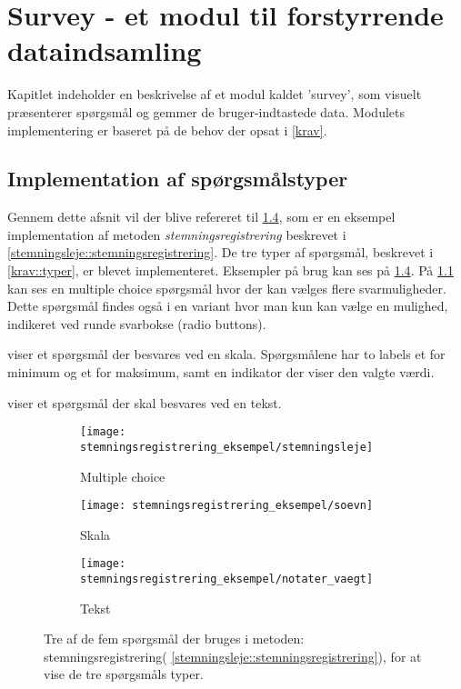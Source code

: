 \chapter{Survey - et modul til forstyrrende dataindsamling}\label{survey}
Kapitlet indeholder en beskrivelse af et modul kaldet 'survey', som visuelt præsenterer spørgsmål og gemmer de bruger-indtastede data.
Modulets implementering er baseret på de behov der opsat i \cref{krav}.

\section{Implementation af spørgsmålstyper}\label{survey:spg}
Gennem dette afsnit vil der blive refereret til \cref{stemreg::spoergsmaal}, som er en eksempel implementation af metoden  \emph{stemningsregistrering} beskrevet i \cref{stemningsleje::stemningsregistrering}.
De tre typer af spørgsmål, beskrevet i \cref{krav::typer}, er blevet implementeret.
Eksempler på brug kan ses på \cref{stemreg::spoergsmaal}.
På \cref{stemreg::stemningsleje} kan ses en multiple choice spørgsmål hvor der kan vælges flere svarmuligheder.
Dette spørgsmål findes også i en variant hvor man kun kan vælge en mulighed, indikeret ved runde svarbokse (radio buttons).

 viser et spørgsmål der besvares ved en skala. 
Spørgsmålene har to labels et for minimum og et for maksimum, samt en indikator der viser den valgte værdi.

 viser et spørgsmål der skal besvares ved en tekst. 


\begin{figure}
	\centering
	\begin{subfigure}[b]{0.45\textwidth}
		\texttt{[image: stemningsregistrering\_eksempel/stemningsleje]}
		\caption{Multiple choice}\label{stemreg::stemningsleje}
	\end{subfigure}
	\hfill
\begin{minipage}[b]{0.45\textwidth}
	\begin{subfigure}[b]{\textwidth}
		\texttt{[image: stemningsregistrering\_eksempel/soevn]}
		\caption{Skala}\label{stemreg::soevn}
	\end{subfigure}
	\newline 
	\begin{subfigure}[b]{\textwidth}
		\texttt{[image: stemningsregistrering\_eksempel/notater\_vaegt]}
		\caption{Tekst}\label{stemreg::notater_vaegt}
	\end{subfigure}	
\end{minipage}	
	\caption{Tre af de fem spørgsmål der bruges i metoden: stemningsregistrering( \cref{stemningsleje::stemningsregistrering}), for at vise de tre spørgsmåls typer.}\label{stemreg::spoergsmaal}
\end{figure}


